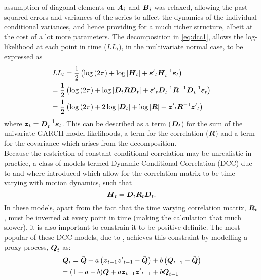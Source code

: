 assumption of diagonal elements on $\mbox{\boldmath$A$}_i$ and $\mbox{\boldmath$B$}_i$ was relaxed, allowing
the past squared errors and variances of the series to affect the dynamics of
the individual conditional variances, and hence providing for a much richer structure,
albeit at the cost of a lot more parameters. The decomposition in \eqref{eq:dcc1},
allows the log-likelihood at each point in time ($LL_t$), in the multivariate
normal case, to be expressed as
\begin{equation}\label{eq:dcc3}
\begin{gathered}
  {LL_t} = \frac{1}
{2}\left( {\log \left( {2\pi } \right) + \log \left| {{\bfH_t}} \right| + {{\bfvarepsilon '}_t}\bfH_t^{ - 1}{\bfvarepsilon _t}} \right) \hfill \\
   = \frac{1}
{2}\left( {\log \left( {2\pi } \right) + \log \left| {{\bfD_t}{\bfR}{\bfD_t}} \right| + {{\bfvarepsilon '}_t}\bfD_t^{ - 1}\bfR^{ - 1}\bfD_t^{ - 1}{\bfvarepsilon _t}} \right) \hfill \\
   = \frac{1}
{2}\left( {\log \left( {2\pi } \right) + 2\log \left| {{\bfD_t}} \right| + \log \left| {{\bfR}} \right| + {{\bfz'}_t}\bfR^{ - 1}{{\bfz'}_t}} \right) \hfill \\
\end{gathered}
\end{equation}
where ${\mbox{\boldmath$z$}_t} = \mbox{\boldmath$D$}_t^{ - 1}{\mbox{\boldmath$\varepsilon$} _t}$. This can be described as a
term ($\mbox{\boldmath$D$}_t$) for the sum of the univariate GARCH model likelihoods, a term
for the correlation ($\mbox{\boldmath$R$}$) and a term for the covariance which arises from
the decomposition.\\
Because the restriction of constant conditional correlation may be unrealistic
in practice, a class of models termed Dynamic Conditional Correlation (DCC) due
to \cite{Engle2002} and \cite{Tse2002a} where introduced which allow
for the correlation matrix to be time varying with motion dynamics, such that
\begin{equation}\label{eq:dcc4}
{\ensuremath{\mbox{\boldmath$H$}}_t} = {\mbox{\boldmath$D$}_t}{\mbox{\boldmath$R$}_t}{\mbox{\boldmath$D$}_t}.
\end{equation}
In these models, apart from the fact that the time varying correlation matrix,
$\mbox{\boldmath$R$}_t$, must be inverted at every point in time (making the calculation that
much slower), it is also important to constrain it to be positive definite.
The most popular of these DCC models, due to \cite{Engle2002}, achieves
this constraint by modelling a proxy process, $\mbox{\boldmath$Q$}_t$ as:
\begin{equation}\label{eq:dcc5}
\begin{gathered}
  {\bfQ_t} = \bar \bfQ + a\left( {{\bfz_{t - 1}}{{\bfz'}_{t - 1}} - \bar \bfQ} \right) + b\left( {{\bfQ_{t - 1}} - \bar \bfQ} \right) \hfill \\
        = (1 - a - b)\bar \bfQ + a{\bfz_{t - 1}}{{\bfz'}_{t - 1}} + b{\bfQ_{t - 1}} \hfill \\
\end{gathered}
\end{equation}
